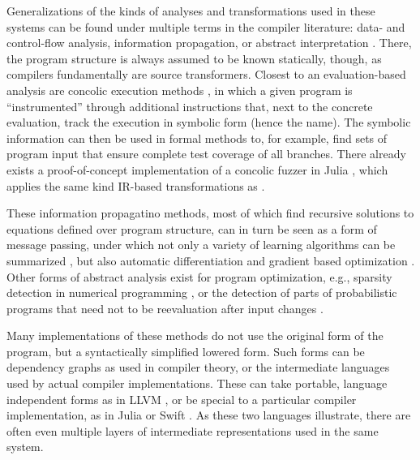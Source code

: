 Generalizations of the kinds of analyses and transformations used in these systems can be found
under multiple terms in the compiler literature: data- and control-flow analysis, information
propagation, or abstract interpretation \parencite{muchnick1997advanced,singer2018static}.  There,
the program structure is always assumed to be known statically, though, as compilers fundamentally
are source transformers.  Closest to an evaluation-based analysis are concolic execution methods
\parencite{sen2005cute,zeller2019concolic}, in which a given program is \enquote{instrumented}
through additional instructions that, next to the concrete evaluation, track the execution in
symbolic form (hence the name).  The symbolic information can then be used in formal methods to, for
example, find sets of program input that ensure complete test coverage of all branches.  There
already exists a proof-of-concept implementation of a concolic fuzzer in Julia
\parencite{churavy2019vchuravy}, which applies the same kind IR-based transformations as
.

These information propagatino methods, most of which find recursive solutions to equations defined
over program structure, can in turn be seen as a form of message passing, under which not only a
variety of learning algorithms can be summarized \parencite{minka2005divergence}, but also automatic
differentiation \parencite{minka2019automatic} and gradient based optimization
\parencite{dauwels2005steepest}.  Other forms of abstract analysis exist for program optimization,
e.g., sparsity detection in numerical programming \parencite{gowda2019sparsity}, or the detection of
parts of probabilistic programs that need not to be reevaluation after input changes
\parencite{becker2020dynamic}.

Many implementations of these methods do not use the original form of the program, but a
syntactically simplified lowered form.  Such forms can be dependency graphs as used in compiler
theory, or the intermediate languages used by actual compiler implementations.  These can take
portable, language independent forms as in LLVM \parencite{llvmproject2019llvm}, or be special to a
particular compiler implementation, as in Julia \parencite{bezanson2017julia} or Swift
\parencite{apple2020swifta}.  As these two languages illustrate, there are often even multiple
layers of intermediate representations used in the same system.

